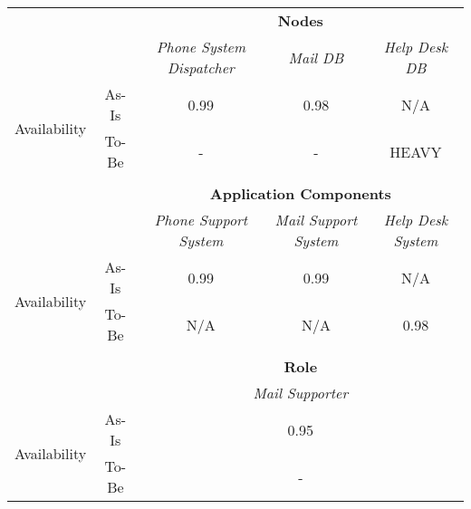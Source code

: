 \begin{table}[H]
	\centering
	\begin{tabular}{|c|c|p{2cm}|p{2.5cm}|p{2.5cm}|p{2.5cm}|}
		\cline{3-6}

		\multicolumn{2}{c}{} & \multicolumn{4}{|c|}{\textbf{Nodes}} \\ \cline{3-6}
		\multicolumn{2}{c|}{} & \multicolumn{1}{c|}{\textsl{Phone System Dispatcher}} & \multicolumn{2}{c|}{\textsl{Mail DB}} & \multicolumn{1}{c|}{\textsl{Help Desk DB}}\\
		\hline
		\multirow{2}{*}{Availability} & As-Is & \multicolumn{1}{c|}{0.99} & \multicolumn{2}{c|}{0.98} & \multicolumn{1}{c|}{N/A}\\ \cline{2-6}
										& To-Be &\multicolumn{1}{c|}{-} & \multicolumn{2}{c|}{-} & \multicolumn{1}{c|}{HEAVY}\\ \hline

		\multicolumn{6}{c}{} \\ \cline{3-6}							
		\multicolumn{2}{c}{} & \multicolumn{4}{|c|}{\textbf{Application Components}} \\ \cline{3-6}
		\multicolumn{2}{c|}{} & \multicolumn{1}{c|}{\textsl{Phone Support System}} & \multicolumn{2}{c|}{\textsl{Mail Support System}} & \multicolumn{1}{c|}{\textsl{Help Desk System}}\\
		\hline
		\multirow{2}{*}{Availability} & As-Is & \multicolumn{1}{c|}{0.99} & \multicolumn{2}{c|}{0.99} & \multicolumn{1}{c|}{N/A}\\ \cline{2-6}
										& To-Be &\multicolumn{1}{c|}{N/A} & \multicolumn{2}{c|}{N/A} & \multicolumn{1}{c|}{0.98}\\ \hline

	   \multicolumn{6}{c}{} \\ \cline{3-6}
		\multicolumn{2}{c}{} & \multicolumn{4}{|c|}{\textbf{Role}} \\ \cline{3-6}
		\multicolumn{2}{c|}{} & \multicolumn{4}{|c|}{\textsl{Mail Supporter}}\\ \hline
		\multirow{2}{*}{Availability} & As-Is & \multicolumn{4}{|c|}{0.95}\\ \cline{2-6}
									   & To-Be & \multicolumn{4}{|c|}{-}\\ \hline


\end{tabular}
\end{table}
